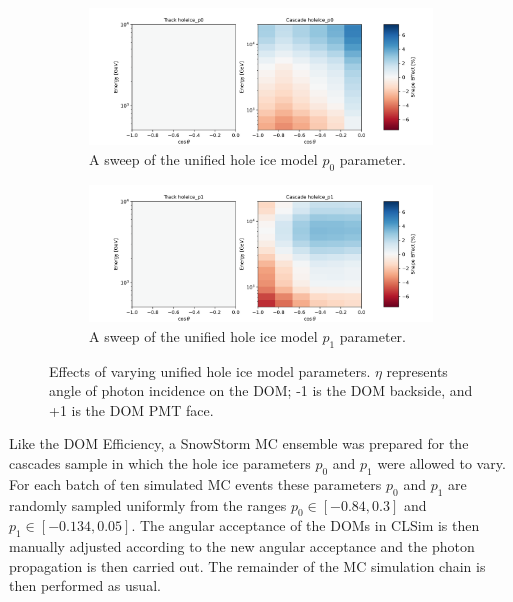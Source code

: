 \documentclass[main.tex]{subfiles}
\begin{document}
\begin{figure}
    \centering
    \begin{subfigure}{.48\textwidth}
        \centering
        \includegraphics[width=0.95\linewidth]{./figures/systematics/holeice_p0.png}
        \caption{A sweep of the unified hole ice model $p_0$ parameter.}
    \end{subfigure}%
    \begin{subfigure}{.48\textwidth}
        \centering
        \includegraphics[width=0.95\linewidth]{./figures/systematics/holeice_p1.png}
        \caption{A sweep of the unified hole ice model $p_1$ parameter.}
    \end{subfigure}
    \caption{Effects of varying unified hole ice model parameters. $\eta$ represents angle of photon incidence on the DOM; -1 is the DOM backside, and +1 is the DOM PMT face.}\label{fig:holeiceparmas}
\end{figure}

Like the DOM Efficiency, a SnowStorm MC ensemble was prepared for the cascades sample in which the hole ice parameters $p_{0}$ and $p_{1}$ were allowed to vary. 
For each batch of ten simulated MC events these parameters $p_{0}$ and $p_{1}$ are randomly sampled uniformly from the ranges $p_{0}\in\left[-0.84, 0.3\right]$ and $p_{1}\in\left[-0.134, 0.05\right]$. 
The angular acceptance of the DOMs in CLSim is then manually adjusted according to the new angular acceptance and the photon propagation is then carried out. 
The remainder of the MC simulation chain is then performed as usual.
\end{document}
